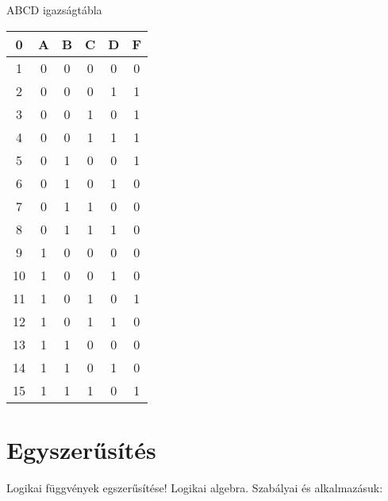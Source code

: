 \documentclass{article}
\begin{document}
\newpage
ABCD igazságtábla
\begin{table}[ht]
    \begin{tabular}{|c|c|c|c|c|c|}
        \hline
        \textbf{0} & \textbf{A} & \textbf{B} & \textbf{C} & \textbf{D} & \textbf{F} \\
        \hline
        1          & 0          & 0          & 0          & 0          & 0          \\
        \hline
        2          & 0          & 0          & 0          & 1          & 1          \\
        \hline
        3          & 0          & 0          & 1          & 0          & 1          \\
        \hline
        4          & 0          & 0          & 1          & 1          & 1          \\
        \hline
        5          & 0          & 1          & 0          & 0          & 1          \\
        \hline
        6          & 0          & 1          & 0          & 1          & 0          \\
        \hline
        7          & 0          & 1          & 1          & 0          & 0          \\
        \hline
        8          & 0          & 1          & 1          & 1          & 0          \\
        \hline
        9          & 1          & 0          & 0          & 0          & 0          \\
        \hline
        10         & 1          & 0          & 0          & 1          & 0          \\
        \hline
        11         & 1          & 0          & 1          & 0          & 1          \\
        \hline
        12         & 1          & 0          & 1          & 1          & 0          \\
        \hline
        13         & 1          & 1          & 0          & 0          & 0          \\
        \hline
        14         & 1          & 1          & 0          & 1          & 0          \\
        \hline
        15         & 1          & 1          & 1          & 0          & 1          \\
        \hline
    \end{tabular}
\end{table}

\section{Egyszerűsítés}
Logikai függvények egszerűsítése! Logikai algebra.
Szabályai és alkalmazásuk:
\end{document}

